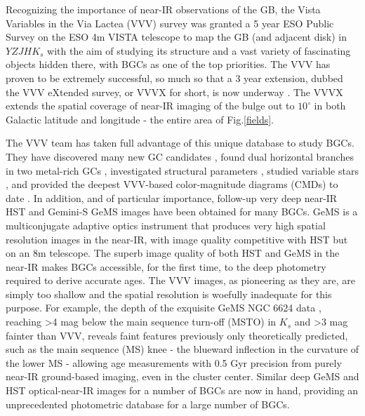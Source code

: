 \documentclass[onecolumn]{aa}
\begin{document}
Recognizing the importance of near-IR observations of the GB, the Vista Variables in the Via Lactea (VVV) survey \citep{Minniti2010} was granted
a 5 year ESO Public Survey on the ESO 4m VISTA telescope to map the GB (and adjacent disk) in $YZJHK_s$ with the aim of
studying its structure and a vast variety of fascinating objects hidden there, with BGCs as one of the top priorities. The VVV has
proven to be extremely successful, so much so that a 3 year extension, dubbed the VVV eXtended survey, or VVVX for short, is now underway
\citep{Minniti2018}. The VVVX extends the spatial coverage of near-IR imaging of
the bulge out to $10^\circ$ in both Galactic latitude and longitude - the entire area of Fig.\ref{fields}.

The VVV team has taken full advantage of this unique database  to study BGCs. They have discovered many new GC candidates \citep[e.g.,][]{MoniBidin2011, Minniti2011, Minniti2017a, Minniti2017b, Palma2019}, found dual horizontal branches in two metal-rich GCs \citep{Mauro2012}, investigated structural parameters  \citep{Cohen2014}, studied variable stars \citep[e.g.,][]{Alonso-Garcia2015}, and provided the deepest VVV-based color-magnitude diagrams (CMDs) to date \citep{Cohen2017}. In addition, and of
particular importance, follow-up very deep near-IR HST \citep{Cohen2018} and Gemini-S GeMS \citep[e.g.,][]{Saracino2016} images have been obtained for many BGCs.  GeMS is a multiconjugate adaptive optics instrument that produces very high spatial resolution images in the near-IR, with image quality competitive with HST but on an 8m telescope. The superb image quality of both HST and GeMS in the near-IR makes BGCs accessible, for the first time, to the deep photometry required to derive accurate ages. The VVV images, as pioneering as they are, are simply too shallow and the spatial resolution is woefully inadequate for this purpose. For example, the depth of the exquisite GeMS NGC 6624 data \citep{Saracino2016}, reaching >4 mag below the main sequence turn-off (MSTO) in $K_s$ and >3 mag fainter than VVV, reveals faint features previously only theoretically predicted, such as the main sequence (MS) knee - the blueward inflection in the curvature of the lower MS - allowing age measurements with 0.5 Gyr precision from purely near-IR ground-based imaging, even in the cluster center.  Similar deep GeMS and HST optical-near-IR images for a number of BGCs are now in hand, providing an unprecedented photometric database for a large number of BGCs. 
\end{document}
